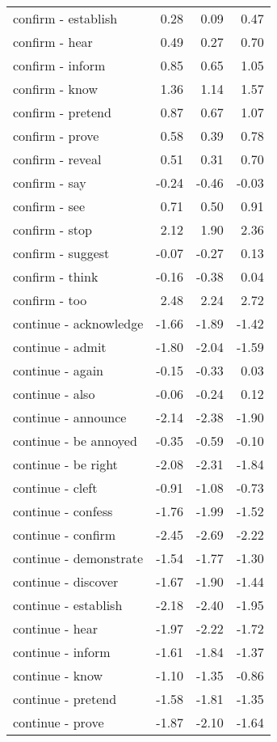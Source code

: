 \begin{longtable}{lrrr}
  confirm - establish & 0.28 & 0.09 & 0.47 \\ 
  confirm - hear & 0.49 & 0.27 & 0.70 \\ 
  confirm - inform & 0.85 & 0.65 & 1.05 \\ 
  confirm - know & 1.36 & 1.14 & 1.57 \\ 
  confirm - pretend & 0.87 & 0.67 & 1.07 \\ 
  confirm - prove & 0.58 & 0.39 & 0.78 \\ 
  confirm - reveal & 0.51 & 0.31 & 0.70 \\ 
  confirm - say & -0.24 & -0.46 & -0.03 \\ 
  confirm - see & 0.71 & 0.50 & 0.91 \\ 
  confirm - stop & 2.12 & 1.90 & 2.36 \\ 
  confirm - suggest & -0.07 & -0.27 & 0.13 \\ 
  confirm - think & -0.16 & -0.38 & 0.04 \\ 
  confirm - too & 2.48 & 2.24 & 2.72 \\ 
  continue - acknowledge & -1.66 & -1.89 & -1.42 \\ 
  continue - admit & -1.80 & -2.04 & -1.59 \\ 
  continue - again & -0.15 & -0.33 & 0.03 \\ 
  continue - also & -0.06 & -0.24 & 0.12 \\ 
  continue - announce & -2.14 & -2.38 & -1.90 \\ 
  continue - be annoyed & -0.35 & -0.59 & -0.10 \\ 
  continue - be right & -2.08 & -2.31 & -1.84 \\ 
  continue - cleft & -0.91 & -1.08 & -0.73 \\ 
  continue - confess & -1.76 & -1.99 & -1.52 \\ 
  continue - confirm & -2.45 & -2.69 & -2.22 \\ 
  continue - demonstrate & -1.54 & -1.77 & -1.30 \\ 
  continue - discover & -1.67 & -1.90 & -1.44 \\ 
  continue - establish & -2.18 & -2.40 & -1.95 \\ 
  continue - hear & -1.97 & -2.22 & -1.72 \\ 
  continue - inform & -1.61 & -1.84 & -1.37 \\ 
  continue - know & -1.10 & -1.35 & -0.86 \\ 
  continue - pretend & -1.58 & -1.81 & -1.35 \\ 
  continue - prove & -1.87 & -2.10 & -1.64 \\ 

\end{longtable}
